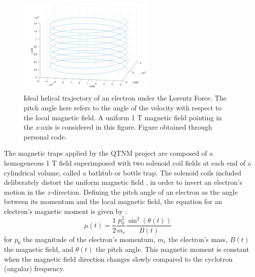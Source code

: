 \documentclass[a4paper,12pt, notitlepage]{article}
\begin{document}
\begin{figure}[hbt!]
\centering
\includegraphics[width=0.6\textwidth]{pictures/idealCyclotronMotion.png}
\vspace{-2mm}
\caption{Ideal helical trajectory of an electron under the Lorentz Force. The pitch angle here refers to the angle of the velocity with respect to the local magnetic field. A uniform 1 T magnetic field pointing in the $z$-axis is considered in this figure. Figure obtained through personal code.}
\label{fig:fig03}
\end{figure}

The magnetic traps applied by the QTNM project are composed of a homogeneous 1 T field superimposed with two solenoid coil fields at each end of a cylindrical volume, called a bathtub or bottle trap. The solenoid coils included deliberately distort the uniform magnetic field \cite{Brown1986}, in order to invert an electron's motion in the $z$-direction. Defining the pitch angle of an electron as the angle between its momentum and the local magnetic field, the equation for an electron's magnetic moment is given by \cite{Ashtari2019}:
\begin{equation}
    \mu(t) = \frac{1}{2}\frac{p_{0}^{2}}{m_{e}}\frac{\sin^{2}(\theta(t))}{B(t)}
\end{equation}
for $p_{0}$ the magnitude of the electron's momentum, $m_{e}$ the electron's mass, $B(t)$ the magnetic field, and $\theta(t)$ the pitch angle. This magnetic moment is constant when the magnetic field direction changes slowly compared to the cyclotron (angular) frequency.
\end{document}
